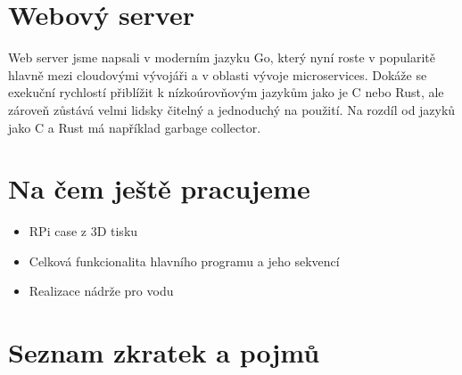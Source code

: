 \documentclass[11pt,a4paper]{article}
\begin{document}
\section*{Webový server}

Web server jsme napsali v moderním jazyku Go, který nyní roste v popularitě hlavně mezi cloudovými vývojáři a v oblasti vývoje microservices. Dokáže se exekuční rychlostí přiblížit k nízkoúrovňovým jazykům jako je C nebo Rust, ale zároveň zůstává velmi lidsky čitelný a jednoduchý na použití. Na rozdíl od jazyků jako C a Rust má například garbage collector.

\section*{Na čem ještě pracujeme}

\begin{itemize}
  \item RPi case z 3D tisku
  \item Celková funkcionalita hlavního programu a jeho sekvencí
  \item Realizace nádrže pro vodu
\end{itemize}

\clearpage

\section*{Seznam zkratek a pojmů}

\begin{acronym}
\end{acronym}
\end{document}
